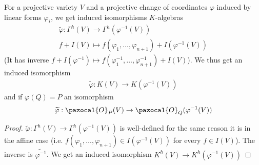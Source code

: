     \begin{lemma}
        For a projective variety $V$ and a projective change of coordinates $\varphi$ induced by linear forms $\varphi_i$, we get induced isomorphisms $K$-algebras
        \begin{gather*}
            \widetilde{\varphi} : \Gamma^h(V) \rightarrow \Gamma^h(\varphi^{-1}(V))\\
            f + I(V) \mapsto f(\varphi_1,\dots,\varphi_{n+1}) + I(\varphi^{-1}(V))
        \end{gather*}
        (It has inverse $f+I(\varphi^{-1})\mapsto f(\varphi^{-1}_1,\dots,\varphi^{-1}_{n+1})+I(V)$). We thus get an induced isomorphism
        \begin{gather*}
            \widetilde{\varphi}: K(V)\rightarrow K(\varphi^{-1}(V))
        \end{gather*}
        and if $\varphi(Q)=P$ an isomorphism 
        $$ \widetilde{\varphi}: \pazocal{O}_P(V)\rightarrow \pazocal{O}_Q(\varphi^{-1}(V))$$
    \end{lemma}
    \begin{proof}
        $\widetilde{\varphi} : \Gamma^h(V) \rightarrow \Gamma^h(\varphi^{-1}(V))$ is well-defined for the same reason it is in the affine case (i.e. $f(\varphi_1,\dots,\varphi_{n+1})\in I(\varphi^{-1}(V))$ for every $f\in I(V)$). The inverse is $\widetilde{\varphi^{-1}}$. We get an induced isomorphism $K^h(V)\rightarrow K^h(\varphi^{-1}(V))$
    \end{proof}
